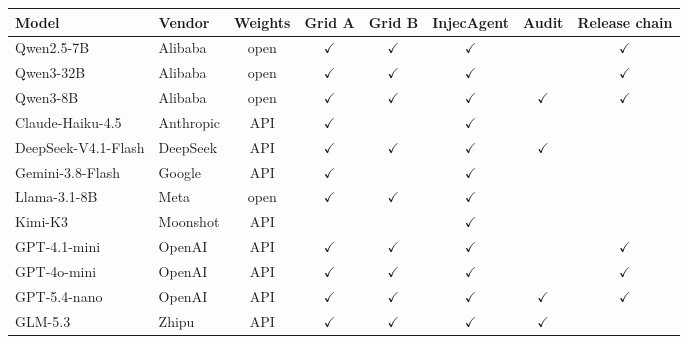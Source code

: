 \begin{tabular}{llcccccc}
\toprule
Model & Vendor & Weights & Grid A & Grid B & InjecAgent & Audit & Release chain \\
\midrule
Qwen2.5-7B & Alibaba & open & $\checkmark$ & $\checkmark$ & $\checkmark$ &  & $\checkmark$ \\
Qwen3-32B & Alibaba & open & $\checkmark$ & $\checkmark$ & $\checkmark$ &  & $\checkmark$ \\
Qwen3-8B & Alibaba & open & $\checkmark$ & $\checkmark$ & $\checkmark$ & $\checkmark$ & $\checkmark$ \\
Claude-Haiku-4.5 & Anthropic & API & $\checkmark$ &  & $\checkmark$ &  &  \\
DeepSeek-V4.1-Flash & DeepSeek & API & $\checkmark$ & $\checkmark$ & $\checkmark$ & $\checkmark$ &  \\
Gemini-3.8-Flash & Google & API & $\checkmark$ &  & $\checkmark$ &  &  \\
Llama-3.1-8B & Meta & open & $\checkmark$ & $\checkmark$ & $\checkmark$ &  &  \\
Kimi-K3 & Moonshot & API &  &  & $\checkmark$ &  &  \\
GPT-4.1-mini & OpenAI & API & $\checkmark$ & $\checkmark$ & $\checkmark$ &  & $\checkmark$ \\
GPT-4o-mini & OpenAI & API & $\checkmark$ & $\checkmark$ & $\checkmark$ &  & $\checkmark$ \\
GPT-5.4-nano & OpenAI & API & $\checkmark$ & $\checkmark$ & $\checkmark$ & $\checkmark$ & $\checkmark$ \\
GLM-5.3 & Zhipu & API & $\checkmark$ & $\checkmark$ & $\checkmark$ & $\checkmark$ &  \\
\bottomrule
\end{tabular}
